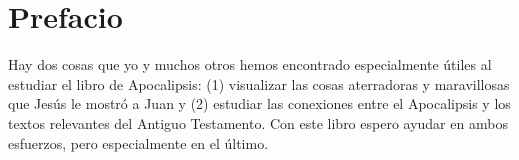 \ClearShipoutPicture
{}

\blankpage
\clearpage
\clearpage

\begin{KeepFromToc}
\tableofcontents
\end{KeepFromToc}
\clearpage
\listoffigures
\clearpage

\chapter{Prefacio}
Hay dos cosas que yo y muchos otros hemos encontrado especialmente útiles al estudiar el libro de Apocalipsis: (1) visualizar las cosas aterradoras y maravillosas que Jesús le mostró a Juan y (2) estudiar las conexiones entre el Apocalipsis y los textos relevantes del Antiguo Testamento. Con este libro espero ayudar en ambos esfuerzos, pero especialmente en el último. \\

